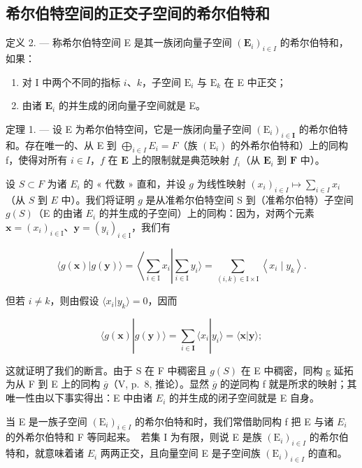 \subsection{希尔伯特空间的正交子空间的希尔伯特和}

定义 2. --- 称希尔伯特空间 E 是其一族闭向量子空间 \((\mathbf{E}_{i})_{i\in I}\) 的希尔伯特和，如果：

\begin{enumerate}
\def\labelenumi{\arabic{enumi})}
\item
  对 I 中两个不同的指标 \(i\)、\(k\)，子空间 \(\mathrm{E}_i\) 与 \(\mathrm{E}_k\) 在 E 中正交；
\item
  由诸 \(\mathbf{E}_i\) 的并生成的闭向量子空间就是 E。
\end{enumerate}

定理 1. --- 设 E 为希尔伯特空间，它是一族闭向量子空间 \((\mathrm{E}_{i})_{i\in\mathbf{I}}\) 的希尔伯特和。存在唯一的、从 E 到 \(\bigoplus_{i\in I}E_{i}=F\)（族 \((\mathrm{E}_{i})\) 的外希尔伯特和）上的同构 f，使得对所有 \(i\in I\)，\(f\) 在 \(\mathbf{E}\) 上的限制就是典范映射 \(f_{i}\)（从 \(\mathbf{E}_i\) 到 \(\mathbf{F}\) 中）。

设 \(S \subset F\) 为诸 \(E_i\) 的 « 代数 » 直和，并设 \(g\) 为线性映射 \((x_i)_{i \in I} \mapsto \sum_{i \in I} x_i\)（从 \(S\) 到 \(E\) 中）。我们将证明 \(g\) 是从准希尔伯特空间 S 到（准希尔伯特）子空间 \(g(S)\)（E 的由诸 \(E_{i}\) 的并生成的子空间）上的同构：因为，对两个元素 \(\mathbf{x} = (x_{i})_{i \in \mathrm{I}}\)、\(\mathbf{y} = (y_{i})_{i \in \mathrm{I}}\)，我们有

\[
\langle g (\mathbf {x}) | g (\mathbf {y}) \rangle = \left\langle \sum_ {i \in \mathrm{I}} x _ {i} \right| \sum_ {i \in \mathrm{I}} y _ {i} \rangle = \sum_ {(i, k) \in \mathrm{I} \times \mathrm{I}} \left\langle x _ {i} \mid y _ {k} \right\rangle .
\]

但若 \(i \neq k\)，则由假设 \(\langle x_i | y_k \rangle = 0\)，因而

\[
\langle g (\mathbf {x}) | g (\mathbf {y}) \rangle = \sum_ {i \in \mathbf {I}} \langle x _ {i} | y _ {i} \rangle = \langle \mathbf {x} | \mathbf {y} \rangle ;
\]

这就证明了我们的断言。由于 S 在 F 中稠密且 \(g(S)\) 在 E 中稠密，同构 g 延拓为从 F 到 E 上的同构 \(\overline{g}\)（V, p.~8, 推论）。显然 \(\overline{g}\) 的逆同构 f 就是所求的映射；其唯一性由以下事实得出：E 中由诸 \(E_{i}\) 的并生成的闭子空间就是 E 自身。

当 E 是一族子空间 \((\mathrm{E}_{i})_{i\in I}\) 的希尔伯特和时，我们常借助同构 f 把 E 与诸 \(E_{i}\) 的外希尔伯特和 F 等同起来。~若集 I 为有限，则说 E 是族 \((\mathrm{E}_{i})_{i\in I}\) 的希尔伯特和，就意味着诸 \(E_{i}\) 两两正交，且向量空间 E 是子空间族 \((\mathrm{E}_{i})_{i\in I}\) 的直和。

